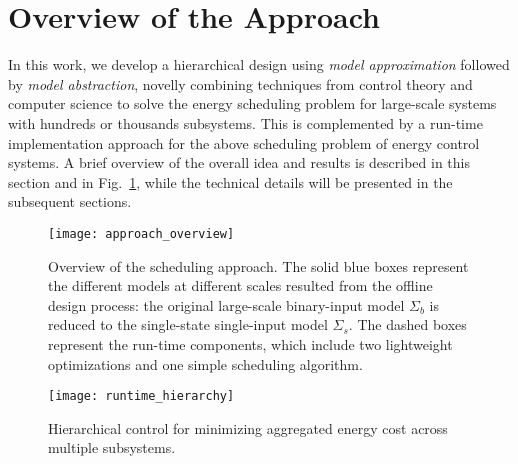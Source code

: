 \section{Overview of the Approach}
\label{sec:overview}

In this work, we develop a hierarchical design using \emph{model approximation} followed by \emph{model abstraction}, novelly combining techniques from control theory and computer science to solve the energy scheduling problem for large-scale systems with hundreds or thousands subsystems. This is complemented by a run-time implementation approach for the above scheduling problem of energy control systems.
A brief overview of the overall idea and results is described in this section and in Fig.~\ref{fig:overview}, while the technical details will be presented in the subsequent sections.

\begin{figure}[tb]
  \centering
  \texttt{[image: approach\_overview]}
  \caption{Overview of the scheduling approach. The solid blue boxes represent the different models at different scales resulted from the offline design process: the original large-scale binary-input model $\Sigma_{b}$ is reduced to the single-state single-input model $\Sigma_{s}$.  The dashed boxes represent the run-time components, which include two lightweight optimizations and one simple scheduling algorithm.}
  \vspace{-10pt}
  \label{fig:overview}
\end{figure}

\begin{figure}[tb]
  \centering
  \texttt{[image: runtime\_hierarchy]}
  \caption{Hierarchical control for minimizing aggregated energy cost across multiple subsystems.}%
    \vspace{-10pt}
  \label{fig:runtime-hierarchy}
\end{figure}

